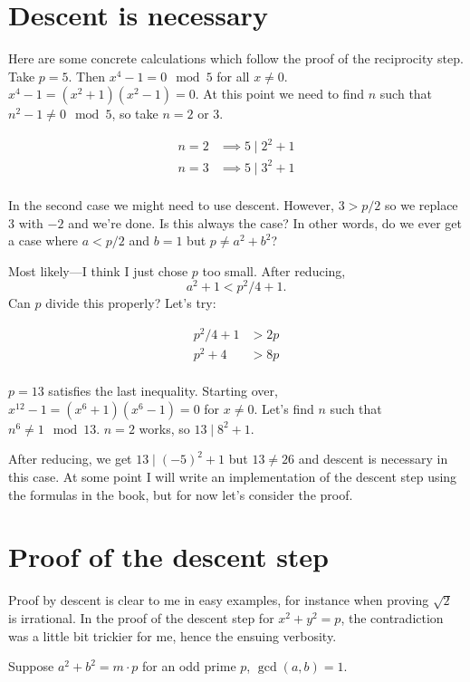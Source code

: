 \documentclass[b5paper,12pt,oneside,openright]{memoir}
\begin{document}
\section{Descent is necessary}
Here are some concrete calculations which follow the proof of the reciprocity step. Take $p = 5$. Then $x^4 - 1 = 0 \mod 5$ for all $x \neq 0$. $x^4 - 1 = (x^2 + 1)(x^2 - 1) = 0$. At this point we need to find $n$ such that $n^2 - 1 \neq 0 \mod 5$, so take $n = 2$ or 3.

\begin{align*}
n = 2 &\implies 5\mid 2^2 + 1\\
n = 3 &\implies 5\mid 3^2 + 1\\
\end{align*}

In the second case we might need to use descent. However, $3 > p/2$ so we replace 3 with $-2$ and we're done. Is this always the case? In other words, do we ever get a case where $a < p/2$ and $b = 1$ but $p \neq a^2 + b^2$?

Most likely---I think I just chose $p$ too small. After reducing, \[a^2 + 1 < p^2/4 + 1.\] Can $p$ divide this properly? Let's try:

\begin{align*}
p^2/4 + 1 &> 2p\\
p^2 + 4 &> 8p\\
\end{align*}

$p = 13$ satisfies the last inequality. Starting over, $x^{12} - 1 = (x^6 + 1)(x^6 - 1) = 0$ for $x \neq 0$. Let's find $n$ such that $n^6 \neq 1 \mod 13$. $n = 2$ works, so $13\mid 8^2 + 1$.

After reducing, we get $13 \mid (-5)^2 + 1$ but $13 \neq 26$ and descent is necessary in this case. At some point I will write an implementation of the descent step using the formulas in the book, but for now let's consider the proof.

\section{Proof of the descent step}

Proof by descent is clear to me in easy examples, for instance when proving $\sqrt{2}$ is irrational. In the proof of the descent step for $x^2+y^2 = p$, the contradiction was a little bit trickier for me, hence the ensuing verbosity.

Suppose $a^2 + b^2 = m\cdot p$ for an odd prime $p$, $\gcd(a, b)=1$.
\end{document}

